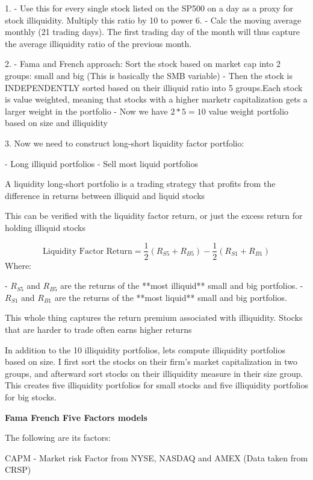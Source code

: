 1.
- Use this for every single stock listed on the SP500 on a day as a proxy for stock illiquidity. Multiply this ratio by 10 to power 6. 
- Calc the moving average monthly (21 trading days). The first trading day of the month will thus capture the average illiquidity ratio of the previous month.

2.
- Fama and French approach: Sort the stock based on market cap into 2 groups: small and big (This is basically the SMB variable)
- Then the stock is INDEPENDENTLY sorted based on their illiquid ratio into 5 groups.Each stock is value weighted, meaning that stocks with a higher marketr capitalization gets a larger weight in the portfolio
- Now we have $2*5=10$ value weight portfolio based on size and illiquidity


3.
Now we need to construct long-short liquidity factor portfolio:

- Long illiquid portfolios
- Sell most liquid portfolios

A liquidity long-short portfolio is a trading strategy that profits from the difference in returns between illiquid and liquid stocks

This can be verified with the liquidity factor return, or just the excess return for holding illiquid stocks

$$
\text{Liquidity Factor Return} = \frac{1}{2} \left( R_{S5} + R_{B5} \right) - \frac{1}{2} \left( R_{S1} + R_{B1} \right)
$$
Where:

- \( R_{S5} \) and \( R_{B5} \) are the returns of the **most illiquid** small and big portfolios.
- \( R_{S1} \) and \( R_{B1} \) are the returns of the **most liquid** small and big portfolios.



This whole thing captures the return premium associated with illiquidity. Stocks that are harder to trade often earns higher returns


In addition to the 10 illiquidity portfolios, lets compute illiquidity portfolios based on size. I first sort the stocks on their firm's market capitalization in two groups, and afterward sort stocks on their illiquidity measure in their size group. This creates five illiquidity portfolios for small stocks and five illiquidity portfolios for big stocks.



\textbf{Fama French Five Factors models}

The following are its factors:

CAPM
- Market risk Factor from NYSE, NASDAQ and AMEX (Data taken from CRSP)

